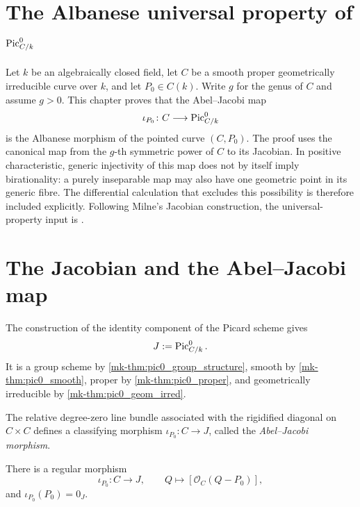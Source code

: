 \section{The Albanese universal property of \(\operatorname{Pic}^0_{C/k}\)}
\label{mk-chap:Albanese_AlbaneseUP}

Let \(k\) be an algebraically closed field, let \(C\) be a smooth proper
geometrically irreducible curve over \(k\), and let \(P_0\in C(k)\).  Write
\(g\) for the genus of \(C\) and assume \(g>0\).  This chapter proves that
the Abel--Jacobi map
\[
  \iota_{P_0}\colon C\longrightarrow \operatorname{Pic}^0_{C/k}
\]
is the Albanese morphism of the pointed curve \((C,P_0)\).  The proof uses
the canonical map from the \(g\)-th symmetric power of \(C\) to its
Jacobian.  In positive characteristic, generic injectivity of this map does
not by itself imply birationality: a purely inseparable map may also have
one geometric point in its generic fibre.  The differential calculation
that excludes this possibility is therefore included explicitly.
Following Milne's Jacobian construction, the universal-property input is
\cite{milne-av}.

\section{The Jacobian and the Abel--Jacobi map}
\label{mk-sec:albaneseup_setup}

The construction of the identity component of the Picard scheme gives
\[
  J:=\operatorname{Pic}^0_{C/k}.
\]
It is a group scheme by \ref{mk-thm:pic0_group_structure}, smooth by
\ref{mk-thm:pic0_smooth}, proper by \ref{mk-thm:pic0_proper}, and geometrically
irreducible by \ref{mk-thm:pic0_geom_irred}.

\begin{definition}
  \label{mk-def:abel_jacobi_morphism}


  The relative degree-zero line bundle associated with the rigidified
  diagonal on \(C\times C\) defines a classifying morphism
  \(\iota_{P_0}\colon C\to J\), called the \emph{Abel--Jacobi morphism}.
\end{definition}

\begin{lemma}
  \label{mk-lem:abel_jacobi_morphism}

  There is a regular morphism
  \[
    \iota_{P_0}\colon C\longrightarrow J,
    \qquad Q\longmapsto [\mathcal O_C(Q-P_0)],
  \]
  and \(\iota_{P_0}(P_0)=0_J\).
\end{lemma}

